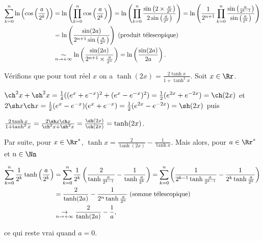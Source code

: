 {{\begin{align*}\ensuremath
\sum_{k=0}^{n}\ln\left(\cos\left(\frac{a}{2^k}\right)\right)&=\ln\left(\prod_{k=0}^{n}\cos\left(\frac{a}{2^k}\right)\right)=\ln\left(\prod_{k=0}^{n}\frac{\sin\left(2\times\frac{a}{2^k}\right)}{2\sin\left(\frac{a}{2^k}\right)}\right)=\ln\left(\frac{1}{2^{n+1}}\prod_{k=0}^{n}\frac{\sin\left(\frac{a}{2^{k-1}}\right)}{\sin\left(\frac{a}{2^k}\right)}\right)\\
 &=\ln\left(\frac{\sin(2a)}{2^{n+1}\sin\left(\frac{a}{2^n}\right)}\right)\;(\text{produit télescopique})\\
 &\underset{n\rightarrow+\infty}{\sim}\ln\left(\frac{\sin(2a)}{2^{n+1}\times\frac{a}{2^n}}\right)=\ln\left(\frac{\sin(2a)}{2a}\right).
\end{align*}

\begin{center}
\fbox{
$\forall a\in\left]0,\frac{\pi}{2}\right[$, $\sum_{n=0}^{+\infty}\ln\left(\cos\left(\frac{a}{2^n}\right)\right)=\ln\left(\frac{\sin(2a)}{2a}\right)$.
}
\end{center}
Vérifions que pour tout réel $x$ on a $\tanh(2x)=\frac{2\tanh x}{1+\tanh^2x}$. Soit $x\in\Rr$.

$\ch^2x+\sh^2x=\frac{1}{4}((e^x+e^{-x})^2+(e^x-e^{-x})^2)=\frac{1}{2}(e^{2x}+e^{-2x})=\ch(2x)$ et $2\sh x\ch x=\frac{1}{2}(e^{x}-e^{-x})(e^x+e^{-x})=\frac{1}{2}(e^{2x}-e^{-2x})=\sh(2x)$ puis

\begin{center}
$\frac{2\tanh x}{1+\tanh^2x}=\frac{2\sh x\ch x}{\ch^2x+\sh^2x}=\frac{\sh(2x)}{\ch(2x)}=\tanh(2x)$.
\end{center}

Par suite, pour $x\in\Rr^*$, $\tanh x=\frac{2}{\tanh(2x)}-\frac{1}{\tanh x}$. Mais alors, pour $a\in\Rr^*$ et $n\in\Nn$

\begin{align*}\ensuremath
\sum_{k=0}^{n}\frac{1}{2^k}\tanh\left(\frac{a}{2^k}\right)&=\sum_{k=0}^{n}\frac{1}{2^k}\left(\frac{2}{\tanh\frac{a}{2^{k-1}}}-\frac{1}{\tanh\frac{a}{2^{k}}}\right)=\sum_{k=0}^{n}\left(\frac{1}{2^{k-1}\tanh\frac{a}{2^{k-1}}}-\frac{1}{2^k\tanh\frac{a}{2^{k}}}\right)\\
 &=\frac{2}{\tanh(2a)}-\frac{1}{2^n\tanh\frac{a}{2^{n}}}\;(\text{somme télescopique})\\
 &\underset{n\rightarrow+\infty}{\rightarrow}\frac{2}{\tanh(2a)}-\frac{1}{a},
\end{align*}

ce qui reste vrai quand $a=0$.

\begin{center}
\end{center}
}
}
